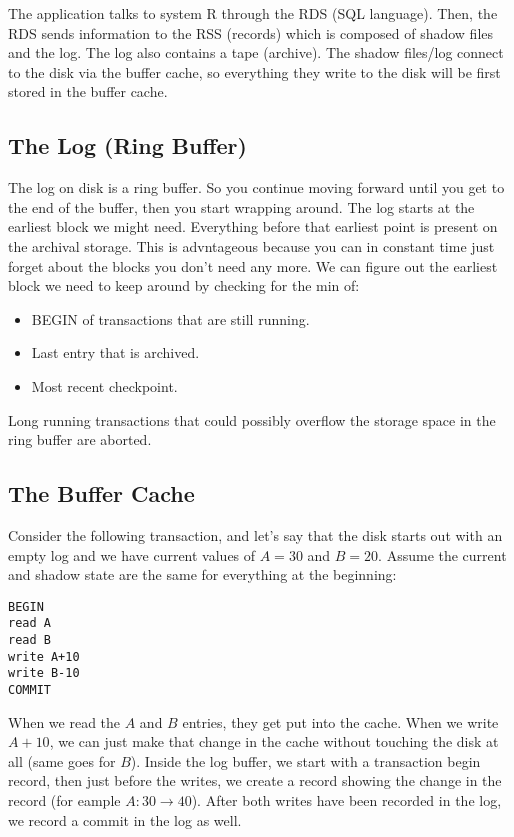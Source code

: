 \documentclass[psamsfonts]{amsart}
\begin{document}
The application talks to system R through the RDS (SQL language). Then, the RDS sends information to the RSS (records) which is composed of shadow files and the log. The log also contains a tape (archive). The shadow files/log connect to the disk via the buffer cache, so everything they write to the disk will be first stored in the buffer cache.

\subsection{The Log (Ring Buffer)}

The log on disk is a ring buffer. So you continue moving forward until you get to the end of the buffer, then you start wrapping around. The log starts at the earliest block we might need. Everything before that earliest point is present on the archival storage. This is advntageous because you can in constant time just forget about the blocks you don't need any more. We can figure out the earliest block we need to keep around by checking for the min of:
\begin{itemize}
  \item BEGIN of transactions that are still running.
  \item Last entry that is archived.
  \item Most recent checkpoint.
\end{itemize}

Long running transactions that could possibly overflow the storage space in the ring buffer are aborted.

\subsection{The Buffer Cache}

Consider the following transaction, and let's say that the disk starts out with an empty log and we have current values of $A=30$ and $B=20$. Assume the current and shadow state are the same for everything at the beginning:

\begin{verbatim}
BEGIN
read A
read B
write A+10
write B-10
COMMIT
\end{verbatim}

When we read the $A$ and $B$ entries, they get put into the cache. When we write $A+10$, we can just make that change in the cache without touching the disk at all (same goes for $B$). Inside the log buffer, we start with a transaction begin record, then just before the writes, we create a record showing the change in the record (for eample $A:30 \rightarrow 40$). After both writes have been recorded in the log, we record a commit in the log as well.
\end{document}
